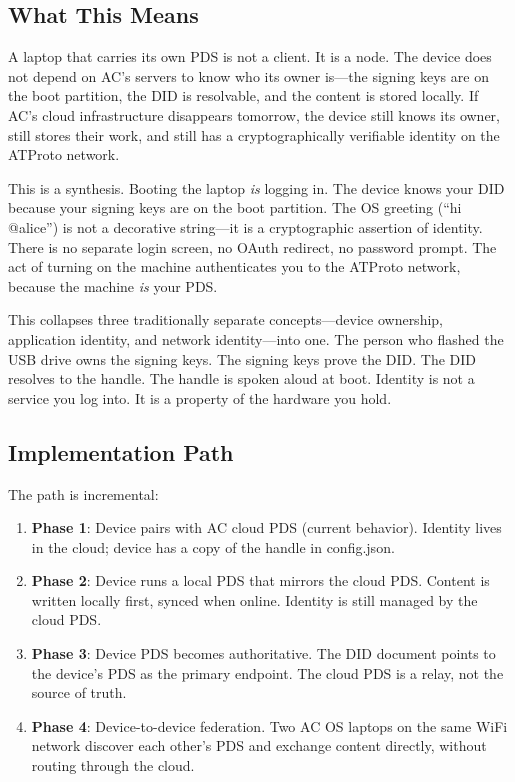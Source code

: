 \documentclass[10pt,letterpaper,twocolumn]{article}
\begin{document}
\subsection{What This Means}

A laptop that carries its own PDS is not a client. It is a node. The device does not depend on AC's servers to know who its owner is---the signing keys are on the boot partition, the DID is resolvable, and the content is stored locally. If AC's cloud infrastructure disappears tomorrow, the device still knows its owner, still stores their work, and still has a cryptographically verifiable identity on the ATProto network.

This is a synthesis. Booting the laptop \emph{is} logging in. The device knows your DID because your signing keys are on the boot partition. The OS greeting (``hi @alice'') is not a decorative string---it is a cryptographic assertion of identity. There is no separate login screen, no OAuth redirect, no password prompt. The act of turning on the machine authenticates you to the ATProto network, because the machine \emph{is} your PDS.

This collapses three traditionally separate concepts---device ownership, application identity, and network identity---into one. The person who flashed the USB drive owns the signing keys. The signing keys prove the DID. The DID resolves to the handle. The handle is spoken aloud at boot. Identity is not a service you log into. It is a property of the hardware you hold.

\subsection{Implementation Path}

The path is incremental:

\begin{enumerate}
  \item \textbf{Phase 1}: Device pairs with AC cloud PDS (current behavior). Identity lives in the cloud; device has a copy of the handle in config.json.
  \item \textbf{Phase 2}: Device runs a local PDS that mirrors the cloud PDS. Content is written locally first, synced when online. Identity is still managed by the cloud PDS.
  \item \textbf{Phase 3}: Device PDS becomes authoritative. The DID document points to the device's PDS as the primary endpoint. The cloud PDS is a relay, not the source of truth.
  \item \textbf{Phase 4}: Device-to-device federation. Two AC OS laptops on the same WiFi network discover each other's PDS and exchange content directly, without routing through the cloud.
\end{enumerate}
\end{document}
